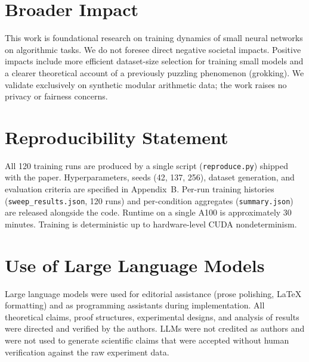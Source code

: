 \documentclass{article}
\begin{document}
\section*{Broader Impact}
This work is foundational research on training dynamics of small neural networks on algorithmic tasks.
We do not foresee direct negative societal impacts.
Positive impacts include more efficient dataset-size selection for training small models and a clearer theoretical account of a previously puzzling phenomenon (grokking).
We validate exclusively on synthetic modular arithmetic data; the work raises no privacy or fairness concerns.

\section*{Reproducibility Statement}
All 120 training runs are produced by a single script (\texttt{reproduce.py}) shipped with the paper.
Hyperparameters, seeds (42, 137, 256), dataset generation, and evaluation criteria are specified in Appendix~B.
Per-run training histories (\texttt{sweep\_results.json}, 120 runs) and per-condition aggregates (\texttt{summary.json}) are released alongside the code.
Runtime on a single A100 is approximately 30 minutes.
Training is deterministic up to hardware-level CUDA nondeterminism.

\section*{Use of Large Language Models}
Large language models were used for editorial assistance (prose polishing, LaTeX formatting) and as
programming assistants during implementation. All theoretical claims, proof structures, experimental
designs, and analysis of results were directed and verified by the authors. LLMs were not credited
as authors and were not used to generate scientific claims that were accepted without human
verification against the raw experiment data.
\end{document}
